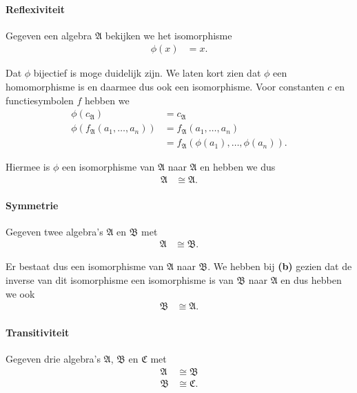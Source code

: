 \documentclass[a4paper,11pt]{article}
\begin{document}
\begin{description}
\paragraph{Reflexiviteit}

Gegeven een algebra $\mathfrak{A}$ bekijken we het isomorphisme
\begin{align*}
\phi(x) &= x.
\end{align*}

Dat $\phi$ bijectief is moge duidelijk zijn. We laten kort zien dat $\phi$ een
homomorphisme is en daarmee dus ook een isomorphisme. Voor constanten $c$ en
functiesymbolen $f$ hebben we
\begin{align*}
\phi(c_{\mathfrak{A}})                       &= c_{\mathfrak{A}} \\
\phi(f_{\mathfrak{A}}(a_{1}, \ldots, a_{n})) &= f_{\mathfrak{A}}(a_{1}, \ldots, a_{n}) \\
                                             &= f_{\mathfrak{A}}(\phi(a_{1}), \ldots, \phi(a_{n})).
\end{align*}

Hiermee is $\phi$ een isomorphisme van $\mathfrak{A}$ naar $\mathfrak{A}$ en
hebben we dus
\begin{align*}
\mathfrak{A} &\cong \mathfrak{A}.
\end{align*}

\paragraph{Symmetrie}

Gegeven twee algebra's $\mathfrak{A}$ en $\mathfrak{B}$ met
\begin{align*}
\mathfrak{A} &\cong \mathfrak{B}.
\end{align*}

Er bestaat dus een isomorphisme van $\mathfrak{A}$ naar $\mathfrak{B}$. We
hebben bij {\bf (b)} gezien dat de inverse van dit isomorphisme een
isomorphisme is van $\mathfrak{B}$ naar $\mathfrak{A}$ en dus hebben we ook
\begin{align*}
\mathfrak{B} &\cong \mathfrak{A}.
\end{align*}

\paragraph{Transitiviteit}

Gegeven drie algebra's $\mathfrak{A}$, $\mathfrak{B}$ en $\mathfrak{C}$ met
\begin{align*}
\mathfrak{A} &\cong \mathfrak{B} \\
\mathfrak{B} &\cong \mathfrak{C}.
\end{align*}


\end{description}
\end{document}
